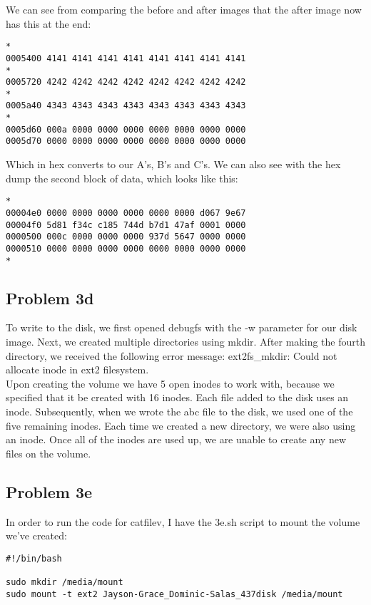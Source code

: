 \documentclass[12pt, a4paper, oneside]{article}
\begin{document}
We can see from comparing the before and after images that the after image now has this at the end: \\
\begin{lstlisting}
*
0005400 4141 4141 4141 4141 4141 4141 4141 4141
*
0005720 4242 4242 4242 4242 4242 4242 4242 4242
*
0005a40 4343 4343 4343 4343 4343 4343 4343 4343
*
0005d60 000a 0000 0000 0000 0000 0000 0000 0000
0005d70 0000 0000 0000 0000 0000 0000 0000 0000

\end{lstlisting}
Which in hex converts to our A's, B's and C's. We can also see with the hex dump the second block of data, which looks like this:
\begin{lstlisting}
*
00004e0 0000 0000 0000 0000 0000 0000 d067 9e67
00004f0 5d81 f34c c185 744d b7d1 47af 0001 0000
0000500 000c 0000 0000 0000 937d 5647 0000 0000
0000510 0000 0000 0000 0000 0000 0000 0000 0000
*
\end{lstlisting}

\subsection*{Problem 3d}
To write to the disk, we first opened debugfs with the -w parameter for our disk image. Next, we created multiple directories using mkdir. After making the fourth directory, we received the following error message: ext2fs\_mkdir: Could not allocate inode in ext2 filesystem. \\

Upon creating the volume we have 5 open inodes to work with, because we specified that it be created with 16 inodes. Each file added to the disk uses an inode. Subsequently, when we wrote the abc file to the disk,  we used one of the five remaining inodes. Each time we created a new directory, we were also using an inode. Once all of the inodes are used up, we are unable to create any new files on the volume.

\subsection*{Problem 3e}
In order to run the code for catfilev, I have the 3e.sh script to mount the volume we've created:
\begin{lstlisting}
#!/bin/bash

sudo mkdir /media/mount
sudo mount -t ext2 Jayson-Grace_Dominic-Salas_437disk /media/mount
\end{lstlisting}
\end{document}
